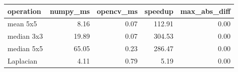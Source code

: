 \begin{tabular}{lrrrr}
\toprule
operation & numpy_ms & opencv_ms & speedup & max_abs_diff \\
\midrule
mean 5x5 & 8.16 & 0.07 & 112.91 & 0.00 \\
median 3x3 & 19.89 & 0.07 & 304.53 & 0.00 \\
median 5x5 & 65.05 & 0.23 & 286.47 & 0.00 \\
Laplacian & 4.11 & 0.79 & 5.19 & 0.00 \\
\bottomrule
\end{tabular}

